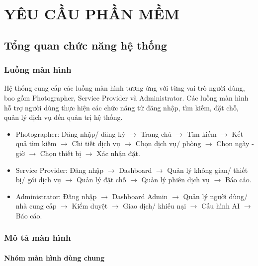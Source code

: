 \chapter{YÊU CẦU PHẦN MỀM}

\section{Tổng quan chức năng hệ thống}

\subsection{Luồng màn hình}
Hệ thống cung cấp các luồng màn hình tương ứng với từng vai trò người dùng, bao gồm Photographer, Service Provider và Administrator. Các luồng màn hình hỗ trợ người dùng thực hiện các chức năng từ đăng nhập, tìm kiếm, đặt chỗ, quản lý dịch vụ đến quản trị hệ thống.

\begin{itemize}
	\item Photographer: Đăng nhập/ đăng ký $\rightarrow$ Trang chủ $\rightarrow$ Tìm kiếm $\rightarrow$ Kết quả tìm kiếm $\rightarrow$ Chi tiết dịch vụ $\rightarrow$ Chọn dịch vụ/ phòng $\rightarrow$ Chọn ngày - giờ $\rightarrow$ Chọn thiết bị $\rightarrow$ Xác nhận đặt.
	
	\item Service Provider: Đăng nhập $\rightarrow$ Dashboard $\rightarrow$ Quản lý không gian/ thiết bị/ gói dịch vụ $\rightarrow$ Quản lý đặt chỗ $\rightarrow$ Quản lý phiên dịch vụ $\rightarrow$ Báo cáo.
	
	\item Administrator: Đăng nhập $\rightarrow$ Dashboard Admin $\rightarrow$ Quản lý người dùng/ nhà cung cấp $\rightarrow$ Kiểm duyệt $\rightarrow$ Giao dịch/ khiếu nại $\rightarrow$ Cấu hình AI $\rightarrow$ Báo cáo.
\end{itemize}

\subsection{Mô tả màn hình}

\subsubsection{Nhóm màn hình dùng chung}

